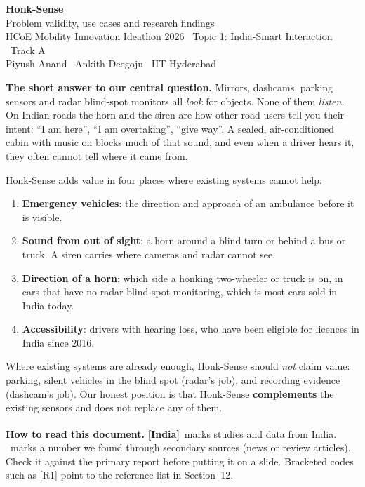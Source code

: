 \documentclass[11pt]{article}
\newcommand{\IN}{{\color{sky}\bfseries[India]}}
\newcommand{\chk}{\textsuperscript{\color{alert}\dag}}
\renewcommand{\cite}[1]{{\color{navy}[#1]}}
\begin{document}
\begin{tcolorbox}[colback=navy,colframe=navy,coltext=white,left=10pt,right=10pt,top=8pt,bottom=8pt]
{\LARGE\bfseries Honk-Sense}\\[2pt]
{\large Problem validity, use cases and research findings}\\[6pt]
\small HCoE Mobility Innovation Ideathon 2026 \textbullet\ Topic 1: India-Smart Interaction \textbullet\ Track A\\
Piyush Anand \textbullet\ Ankith Deegoju \textbullet\ IIT Hyderabad
\end{tcolorbox}

\begin{keybox}
\textbf{The short answer to our central question.}
Mirrors, dashcams, parking sensors and radar blind-spot monitors all \emph{look} for objects. None of them \emph{listen}. On Indian roads the horn and the siren are how other road users tell you their intent: ``I am here'', ``I am overtaking'', ``give way''. A sealed, air-conditioned cabin with music on blocks much of that sound, and even when a driver hears it, they often cannot tell where it came from.

Honk-Sense adds value in four places where existing systems cannot help:
\begin{enumerate}[leftmargin=*]
  \item \textbf{Emergency vehicles}: the direction and approach of an ambulance before it is visible.
  \item \textbf{Sound from out of sight}: a horn around a blind turn or behind a bus or truck. A siren carries where cameras and radar cannot see.
  \item \textbf{Direction of a horn}: which side a honking two-wheeler or truck is on, in cars that have no radar blind-spot monitoring, which is most cars sold in India today.
  \item \textbf{Accessibility}: drivers with hearing loss, who have been eligible for licences in India since 2016.
\end{enumerate}

Where existing systems are already enough, Honk-Sense should \emph{not} claim value: parking, silent vehicles in the blind spot (radar's job), and recording evidence (dashcam's job). Our honest position is that Honk-Sense \textbf{complements} the existing sensors and does not replace any of them.
\end{keybox}

{\small\color{muted}\textbf{How to read this document.} \IN\ marks studies and data from India. \chk\ marks a number we found through secondary sources (news or review articles). Check it against the primary report before putting it on a slide. Bracketed codes such as \cite{R1} point to the reference list in Section~12.}
\end{document}
